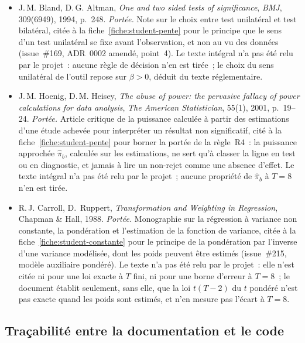 \documentclass[a4paper,11pt]{article}
\begin{document}
\begin{itemize}[itemsep=4pt]
  \item J.\,M. Bland, D.\,G. Altman, \emph{One and two sided tests of significance},
  \emph{BMJ}, 309(6949), 1994, p.~248.
  \emph{Portée.} Note sur le choix entre test unilatéral et test bilatéral, citée à la
  fiche~\ref{fiche:student-pente} pour le principe que le sens d'un test unilatéral se fixe avant
  l'observation, et non au vu des données (issue~\#169, ADR~0002 amendé, point~4). Le texte
  intégral n'a pas été relu par le projet~: aucune règle de décision n'en est tirée~; le choix du
  sens unilatéral de l'outil repose sur $\beta > 0$, déduit du texte réglementaire.

  \item J.\,M. Hoenig, D.\,M. Heisey, \emph{The abuse of power: the pervasive fallacy of power
  calculations for data analysis}, \emph{The American Statistician}, 55(1), 2001, p.~19--24.
  \emph{Portée.} Article critique de la puissance calculée à partir des estimations d'une étude
  achevée pour interpréter un résultat non significatif, cité à la fiche~\ref{fiche:student-pente}
  pour borner la portée de la règle~R4~: la puissance approchée $\hat\pi_b$, calculée sur les
  estimations, ne sert qu'à classer la ligne en test ou en diagnostic, et jamais à lire un
  non-rejet comme une absence d'effet. Le texte intégral n'a pas été relu par le projet~; aucune
  propriété de $\hat\pi_b$ à $T = 8$ n'en est tirée.

  \item R.\,J. Carroll, D.~Ruppert, \emph{Transformation and Weighting in Regression}, Chapman
  \& Hall, 1988.
  \emph{Portée.} Monographie sur la régression à variance non constante, la pondération et
  l'estimation de la fonction de variance, citée à la fiche~\ref{fiche:student-constante} pour le
  principe de la pondération par l'inverse d'une variance modélisée, dont les poids peuvent être
  estimés (issue~\#215, modèle auxiliaire pondéré). Le texte n'a pas été relu par le projet~: elle
  n'est citée ni pour une loi exacte à $T$ fini, ni pour une borne d'erreur à $T = 8$~; le
  document établit seulement, sans elle, que la loi $t(T-2)$ du $t$ pondéré n'est pas exacte quand
  les poids sont estimés, et n'en mesure pas l'écart à $T = 8$.
\end{itemize}


\subsection{Traçabilité entre la documentation et le code}
\end{document}

